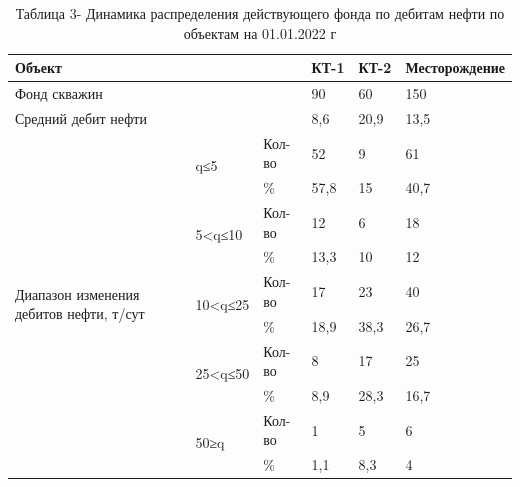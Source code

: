 \begin{table}[H]
\caption*{Таблица 3- Динамика распределения действующего фонда по дебитам нефти по объектам на 01.01.2022 г}
\centering
\begin{tabular}{|lll|l|l|l|}
\hline
\multicolumn{3}{|l|}{Объект} & КТ-1 & КТ-2 & Месторождение \\ \hline
\multicolumn{3}{|l|}{Фонд скважин} & 90 & 60 & 150 \\ \hline
\multicolumn{3}{|l|}{Средний дебит нефти} & 8,6 & 20,9 & 13,5 \\ \hline
\multicolumn{1}{|p{0.2\textwidth}|}{\multirow{10}{=}{Диапазон изменения дебитов нефти, т/сут}} & \multicolumn{1}{l|}{\multirow{2}{*}{q≤5}} & Кол-во & 52 & 9 & 61 \\ \cline{3-6} 
\multicolumn{1}{|l|}{} & \multicolumn{1}{l|}{} & \% & 57,8 & 15 & 40,7 \\ \cline{2-6} 
\multicolumn{1}{|l|}{} & \multicolumn{1}{l|}{\multirow{2}{*}{5<q≤10}} & Кол-во & 12 & 6 & 18 \\ \cline{3-6} 
\multicolumn{1}{|l|}{} & \multicolumn{1}{l|}{} & \% & 13,3 & 10 & 12 \\ \cline{2-6} 
\multicolumn{1}{|l|}{} & \multicolumn{1}{l|}{\multirow{2}{*}{10<q≤25}} & Кол-во & 17 & 23 & 40 \\ \cline{3-6} 
\multicolumn{1}{|l|}{} & \multicolumn{1}{l|}{} & \% & 18,9 & 38,3 & 26,7 \\ \cline{2-6} 
\multicolumn{1}{|l|}{} & \multicolumn{1}{l|}{\multirow{2}{*}{25<q≤50}} & Кол-во & 8 & 17 & 25 \\ \cline{3-6} 
\multicolumn{1}{|l|}{} & \multicolumn{1}{l|}{} & \% & 8,9 & 28,3 & 16,7 \\ \cline{2-6} 
\multicolumn{1}{|l|}{} & \multicolumn{1}{l|}{\multirow{2}{*}{50≥q}} & Кол-во & 1 & 5 & 6 \\ \cline{3-6} 
\multicolumn{1}{|l|}{} & \multicolumn{1}{l|}{} & \% & 1,1 & 8,3 & 4 \\ \hline
\end{tabular}
\end{table}

